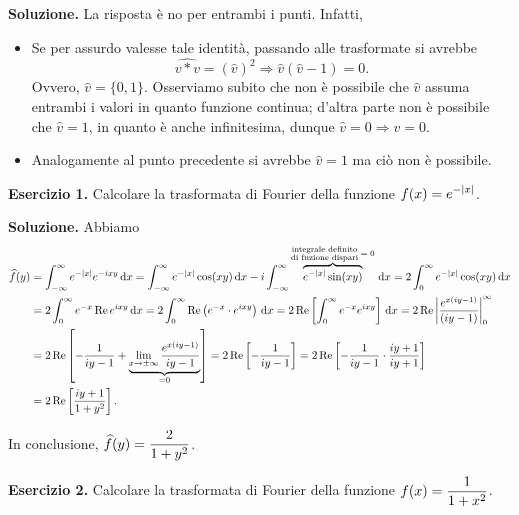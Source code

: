 \textbf{Soluzione.} La risposta è no per entrambi i punti. Infatti,

\begin{itemize}

	\item Se per assurdo valesse tale identità, passando alle trasformate si avrebbe 
	$$
		\hat{v \ast v } = (\hat{v})^2 \Longrightarrow \hat{v}(\hat{v} - 1) = 0.
	$$
	Ovvero, $\hat{v} = \{0,1\}$. Osserviamo subito che non è possibile che $\hat{v}$ assuma entrambi i valori in quanto funzione continua; d'altra parte non è possibile che $\hat{v} = 1$, in quanto è anche infinitesima, dunque $\hat{v} = 0 \Longrightarrow v = 0$.


	\item Analogamente al punto precedente si avrebbe $\hat{v} = 1$ ma ciò non è possibile.

\end{itemize}

\vss

\textbf{Esercizio 1.} Calcolare la trasformata di Fourier della funzione $\displaystyle f(x) = e^{-|x|}$.

\textbf{Soluzione.}
Abbiamo
\begin{align*}
	\widehat{f}(y) & = \int_{-\infty}^\infty e^{-|x|} e^{-ixy} \,\mathrm{d} x 
	= \int_{-\infty}^\infty e^{-|x|} \cos(xy) \,\mathrm{d} x 
	- i \int_{-\infty}^\infty \overbrace{e^{-|x|} \sin(xy)}^{\substack{\text{integrale definito} \\ \text{di fuzione dispari}} \; = \; 0 } \,\mathrm{d} x
	= 2 \int_{0}^{\infty} e^{-|x|} \cos(xy) \,\mathrm{d} x \\
	& = 2 \int_0^\infty e^{-x} \operatorname{Re} e^{ixy} \,\mathrm{d} x
	= 2 \int_0^\infty \operatorname{Re} \left( e^{-x} \cdot e^{ixy} \right) \,\mathrm{d} x
	= 2 \operatorname{Re} \left[ \int_0^\infty e^{-x} e^{ixy} \right] \,\mathrm{d} x
	= 2 \operatorname{Re} \left| \frac{e^{x(iy - 1)}}{(iy - 1)} \right|_0^\infty \\
	& = 2 \operatorname{Re} \left[ -\frac{1}{iy - 1} + \underbrace{\lim_{x \to \pm \infty} \frac{e^{x(iy -1)}}{iy - 1}}_{= 0}\right]
	= 2 \operatorname{Re} \left[ -\frac{1}{iy - 1} \right]
	= 2\operatorname{Re} \left[ -\frac{1}{iy-1} \cdot \frac{iy + 1}{iy + 1} \right] \\
	& = 2\operatorname{Re} \left[ \frac{iy + 1}{1 + y^2} \right].
\end{align*}

In conclusione, $\displaystyle \widehat{f}(y) = \frac{2}{1 + y^2}$.

\vss

\textbf{Esercizio 2.} Calcolare la trasformata di Fourier della funzione $\displaystyle f(x) = \frac{1}{1 + x^2}$.

